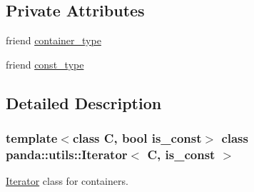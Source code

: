 \subsection*{Private Attributes}
\begin{DoxyCompactItemize}
\item 
friend \hyperlink{classpanda_1_1utils_1_1Iterator_a9f6858f9658d84406448bc3375212077}{container\_\-type}
\item 
friend \hyperlink{classpanda_1_1utils_1_1Iterator_af203547ac2e312fa79abc7bfdd8fd5a1}{const\_\-type}
\end{DoxyCompactItemize}


\subsection{Detailed Description}
\subsubsection*{template$<$class C, bool is\_\-const$>$ class panda::utils::Iterator$<$ C, is\_\-const $>$}

\hyperlink{classpanda_1_1utils_1_1Iterator}{Iterator} class for containers. 

